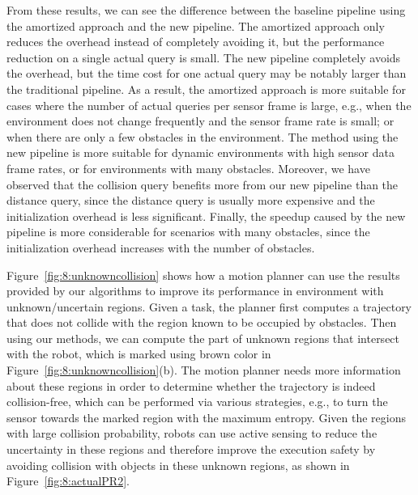 From these results, we can see the difference between the baseline pipeline using the amortized approach and the new pipeline. The amortized approach
only reduces the overhead instead of completely avoiding it, but the
performance reduction on a single actual query is small. The new pipeline completely avoids the overhead, but the time
cost for one actual query may be notably larger than the traditional
pipeline. As a result, the amortized approach is more suitable for
cases where the number of actual queries per sensor frame is large,
e.g., when the environment does not change frequently and the sensor frame rate is
small; or when there are only a few obstacles in the environment. The
method using the new pipeline is more suitable for dynamic
environments with high sensor data frame rates, or for environments with
many obstacles. Moreover, we have observed that the collision query benefits more from our new pipeline than the distance query, since the distance query is usually more expensive and the initialization overhead is less significant. Finally, the speedup caused by the new pipeline is more considerable for scenarios with many obstacles, since the initialization overhead increases with the number of obstacles.

Figure~\ref{fig:8:unknowncollision} shows how a motion planner can use the results provided by our algorithms to improve its performance in environment with unknown/uncertain regions. Given a task, the planner first computes a trajectory that does not collide with the region known to be occupied by obstacles. Then using our methods, we can compute the part of unknown regions that intersect with the robot, which is marked using brown color in Figure~\ref{fig:8:unknowncollision}(b). The motion planner needs more information about these regions in order to determine whether the trajectory is indeed collision-free, which can be performed via various strategies, e.g., to turn the sensor towards the marked region with the maximum entropy. Given the regions with large collision probability, robots can use active sensing to reduce the uncertainty in these regions and therefore improve the execution safety by avoiding collision with objects in these unknown regions, as shown in Figure~\ref{fig:8:actualPR2}.

